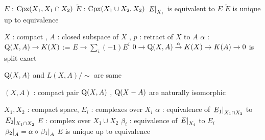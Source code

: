 \documentclass[dvipdfmx]{jsarticle}
\begin{document}
\begin{Theorem}
\itemenum \(E\) : \(\text{Cpx}(X_1, X_1 \cap X_2)\)
\itemthen \THENLINE
\itemenum \(\tilde{E}\) : \(\text{Cpx}(X_1 \cup X_2, X_2)\)
\itemwith \(\left. {E} \right| _{X_1}\) is equivalent to \(E\)
\itemwith \(\tilde{E}\) is unique up to equivalence
\end{Theorem}

\begin{Theorem}
\itemenum \(X\) : compact , \(A\) : closed subspace of \(X\) , \(p\) : retract of \(X\) to \(A\)
\itemthen \THENLINE
\itemenum \(\alpha\) : \(\text{Q}(X, A) \to K(X)\) := \(E \to \sum_i (-1) E^i\)
\itemwith \(0 \to \text{Q}(X, A) \overset{\alpha}{\to} K(X) \to K(A) \to 0\) is split exact 
\end{Theorem}

\begin{Theorem}
\itemthen \THENLINE
\itemwith \(\text{Q}(X, A)\) and \(L(X,A) / \sim\) are same
\end{Theorem}

\begin{Theorem}
\itemenum \((X,A)\) : compact pair
\itemthen \THENLINE
\itemenum \(\text{Q}(X, A)\) , \(\text{Q}(X-A)\) are naturally isomorphic
\end{Theorem}

\begin{Theorem}
\itemenum \(X_1,X_2\) : compact space, \(E_i\) : complexes over \(X_i\)
\itemenum \(\alpha\) : equivalence of \(\left. {E_1} \right| _{X_1 \cap X_2}\) to \(\left. {E_2} \right| _{X_1 \cap X_2}\)
\itemthen \THENLINE
\itemenum \(E\) : complex over \(X_1 \cup X_2\)
\itemenum \(\beta_i\) : equivalence of \(\left. {E} \right| _{X_i}\) to \(E_i\)
\itemwith \(\left. {\beta_2} \right| _{A} = \alpha \circ \left. {\beta_1} \right| _{A}\)
\itemwith \(E\) is unique up to equivalence
\end{Theorem}
\end{document}
